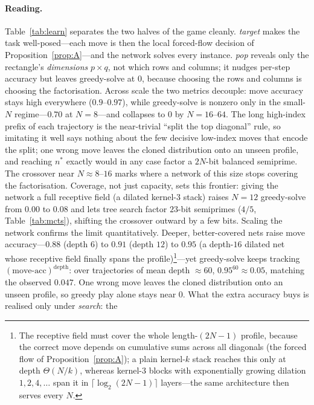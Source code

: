 \documentclass[11pt]{article}
\theoremstyle{definition}
\theoremstyle{plain}
\theoremstyle{remark}
\begin{document}
\paragraph{Reading.}
Table~\ref{tab:learn} separates the two halves of the game cleanly. \emph{target} makes the
task well-posed---each move is then the local forced-flow decision of
Proposition~\ref{prop:A}---and the network solves every instance. \emph{pop} reveals only
the rectangle's \emph{dimensions} $p\times q$, not which rows and columns; it nudges per-step
accuracy but leaves greedy-solve at $0$, because choosing the rows and columns is choosing
the factorisation. Across scale the two metrics decouple: move accuracy stays high
everywhere ($0.9$--$0.97$), while greedy-solve is nonzero only in the small-$N$
regime---$0.70$ at $N=8$---and collapses to $0$ by $N=16$--$64$. The long high-index prefix
of each trajectory is the near-trivial ``split the top diagonal'' rule, so imitating it well
says nothing about the few decisive low-index moves that encode the split; one wrong move
leaves the cloned distribution onto an unseen profile, and reaching $n^{*}$ exactly would in
any case factor a $2N$-bit balanced semiprime. The crossover near $N\approx 8$--$16$ marks
where a network of this size stops covering the factorisation. Coverage, not just capacity,
sets this frontier: giving the network a full receptive field (a dilated kernel-$3$ stack)
raises $N=12$ greedy-solve from $0.00$ to $0.08$ and lets tree search factor $23$-bit
semiprimes ($4/5$, Table~\ref{tab:mcts}), shifting the crossover outward by a few bits.
Scaling the network confirms the limit quantitatively. Deeper, better-covered nets raise
move accuracy---$0.88$ (depth $6$) to $0.91$ (depth $12$) to $0.95$ (a depth-$16$ dilated net
whose receptive field finally spans the profile)\footnote{The receptive field must cover the
whole length-$(2N-1)$ profile, because the correct move depends on cumulative sums across all
diagonals (the forced flow of Proposition~\ref{prop:A}); a plain kernel-$k$ stack reaches
this only at depth $\Theta(N/k)$, whereas kernel-$3$ blocks with exponentially growing
dilation $1,2,4,\dots$ span it in $\lceil\log_2(2N-1)\rceil$ layers---the same architecture
then serves every $N$.}---yet greedy-solve keeps tracking $(\text{move-acc})^{\text{depth}}$:
over trajectories of mean depth $\approx 60$, $0.95^{60}\approx 0.05$, matching the observed
$0.047$. One wrong move leaves the cloned distribution onto an unseen profile, so greedy play
alone stays near $0$. What the extra accuracy buys is realised only under \emph{search}: the
\end{document}
